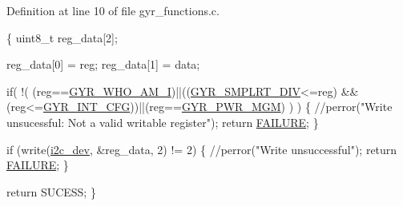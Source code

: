 Definition at line 10 of file gyr\-\_\-functions.\-c.


\begin{DoxyCode}
\{
  uint8\_t reg\_data[2];

  reg\_data[0] = reg;
  reg\_data[1] = data;

  \textcolor{keywordflow}{if}( !( (reg==\hyperlink{communication_2imu__regs_8h_ab2499ff4167376accdbdec09f5e1b021}{GYR\_WHO\_AM\_I})||((\hyperlink{communication_2imu__regs_8h_a04a18568e6e39825c98be5ec2976bec4}{GYR\_SMPLRT\_DIV}<=reg)
      &&(reg<=\hyperlink{communication_2imu__regs_8h_ad0b8386ab023e17beb305025abf96e18}{GYR\_INT\_CFG}))||(reg==\hyperlink{communication_2imu__regs_8h_a5eba4af610a1ec85320e940bf44855eb}{GYR\_PWR\_MGM}) ) )
  \{
      \textcolor{comment}{//perror("Write unsucessful: Not a valid writable register");}
      \textcolor{keywordflow}{return} \hyperlink{calibration_2calibration_8h_a6d58f9ac447476b4e084d7ca383f5183}{FAILURE};
  \}
        
  \textcolor{keywordflow}{if} (write(\hyperlink{CommunicationV0_2communication_8c_a7751bd45ac1064efb35adf1f19c25db8}{i2c\_dev}, &reg\_data, 2) != 2) \{                
          \textcolor{comment}{//perror("Write unsuccessful");}
          \textcolor{keywordflow}{return} \hyperlink{calibration_2calibration_8h_a6d58f9ac447476b4e084d7ca383f5183}{FAILURE};
  \}

  \textcolor{keywordflow}{return} SUCESS;
\}
\end{DoxyCode}
